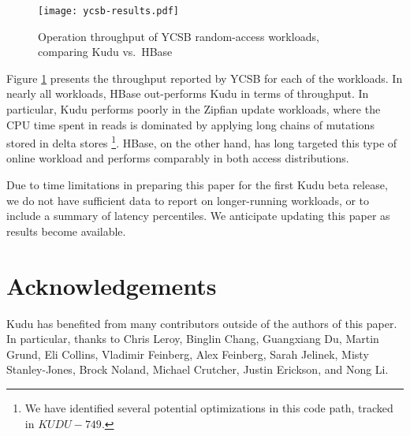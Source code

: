 \documentclass[twocolumn,9pt]{article}
\begin{document}
\begin{figure}
  \texttt{[image: ycsb-results.pdf]}
  \caption{Operation throughput of YCSB random-access workloads, comparing Kudu vs.\ HBase}
  \label{fig:ycsb_throughput}
\end{figure}

Figure \ref{fig:ycsb_throughput} presents the throughput reported by YCSB for each of the
workloads. In nearly all workloads, HBase out-performs Kudu in terms of throughput. In
particular, Kudu performs poorly in the Zipfian update workloads, where the CPU time
spent in reads is dominated by applying long chains of mutations stored in delta stores
\footnote{We have identified several potential optimizations in this code path, tracked
in $KUDU-749$.}. HBase, on the other hand, has long targeted this type of online workload
and performs comparably in both access distributions.

Due to time limitations in preparing this paper for the first Kudu beta release, we do
not have sufficient data to report on longer-running workloads, or to include a summary
of latency percentiles. We anticipate updating this paper as results become available.


\section{Acknowledgements}
Kudu has benefited from many contributors outside of the authors of this paper. In particular, thanks to Chris Leroy, Binglin Chang, Guangxiang Du, Martin Grund, Eli Collins, Vladimir Feinberg, Alex Feinberg, Sarah Jelinek, Misty Stanley-Jones, Brock Noland, Michael Crutcher, Justin Erickson, and Nong Li.



\end{document}
